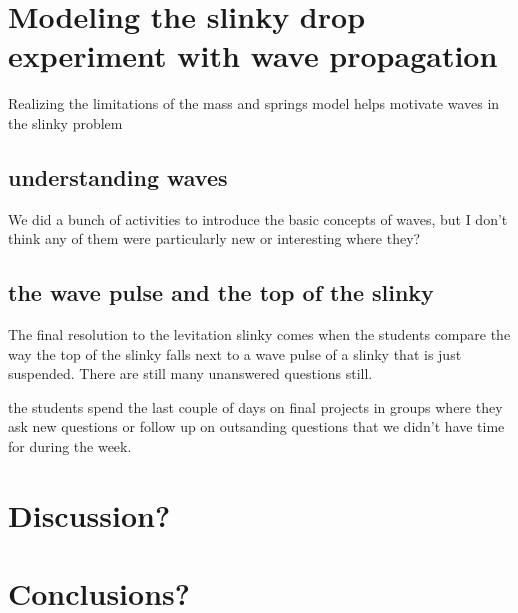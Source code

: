 \documentclass[aps,pra,twocolumn,10pt,superscriptaddress,showpacs,amsmath,amssymb,nofootinbib]{revtex4-1}
\begin{document}
\section{Modeling the slinky drop experiment with wave propagation}

Realizing the limitations of the  mass and springs model helps motivate waves in the slinky problem

\subsection{understanding waves}
 We did a bunch of activities to introduce the basic concepts of waves, but I don't think any of them were particularly new or interesting where they?

\subsection{the wave pulse and the top of the slinky }
The final resolution to the levitation slinky comes when the students compare the way the top of the slinky falls next to a wave pulse of a slinky that is just suspended.  There are still many unanswered questions still.

the students spend the last couple of days on final projects in groups where they ask new questions or follow up on outsanding questions that we didn't have time for during the week.  


\section{Discussion?}



\section{Conclusions?}

\acknowledgments 


\end{document}
